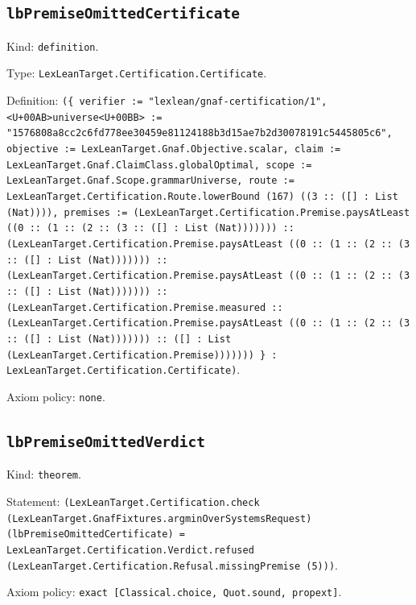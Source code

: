 \documentclass[11pt]{article}
\begin{document}
\subsection*{\texttt{lbPremiseOmittedCertificate}}
\noindent Kind: \texttt{definition}.\par
\noindent Type: \texttt{LexLeanTarget.Certification.Certificate}.\par
\noindent Definition: \texttt{(\{ verifier := "lexlean/gnaf-certification/1", <U+00AB>universe<U+00BB> := "1576808a8cc2c6fd778ee30459e81124188b3d15ae7b2d30078191c5445805c6", objective := LexLeanTarget.Gnaf.Objective.scalar, claim := LexLeanTarget.Gnaf.ClaimClass.globalOptimal, scope := LexLeanTarget.Gnaf.Scope.grammarUniverse, route := LexLeanTarget.Certification.Route.lowerBound (167) ((3 :: ([] : List (Nat)))), premises := (LexLeanTarget.Certification.Premise.paysAtLeast ((0 :: (1 :: (2 :: (3 :: ([] : List (Nat))))))) :: (LexLeanTarget.Certification.Premise.paysAtLeast ((0 :: (1 :: (2 :: (3 :: ([] : List (Nat))))))) :: (LexLeanTarget.Certification.Premise.paysAtLeast ((0 :: (1 :: (2 :: (3 :: ([] : List (Nat))))))) :: (LexLeanTarget.Certification.Premise.measured :: (LexLeanTarget.Certification.Premise.paysAtLeast ((0 :: (1 :: (2 :: (3 :: ([] : List (Nat))))))) :: ([] : List (LexLeanTarget.Certification.Premise))))))) \} : LexLeanTarget.Certification.Certificate)}.\par
\noindent Axiom policy: \texttt{none}.\par
\subsection*{\texttt{lbPremiseOmittedVerdict}}
\noindent Kind: \texttt{theorem}.\par
\noindent Statement: \texttt{(LexLeanTarget.Certification.check (LexLeanTarget.GnafFixtures.argminOverSystemsRequest) (lbPremiseOmittedCertificate) = LexLeanTarget.Certification.Verdict.refused (LexLeanTarget.Certification.Refusal.missingPremise (5)))}.\par
\noindent Axiom policy: \texttt{exact [Classical.choice, Quot.sound, propext]}.\par
\end{document}
